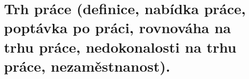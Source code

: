 \clearpage
\section{Trh práce (definice, nabídka práce, poptávka po práci, rovnováha na trhu práce,
nedokonalosti na trhu práce, nezaměstnanost).}
